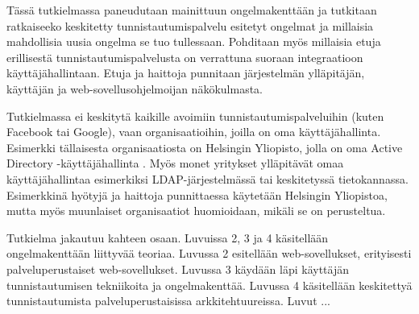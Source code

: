 Tässä tutkielmassa paneudutaan mainittuun ongelmakenttään ja tutkitaan ratkaiseeko keskitetty tunnistautumispalvelu esitetyt ongelmat ja millaisia mahdollisia uusia ongelma se tuo tullessaan. Pohditaan myös millaisia etuja erillisestä tunnistautumispalvelusta on verrattuna suoraan integraatioon käyttäjähallintaan. Etuja ja haittoja punnitaan järjestelmän ylläpitäjän, käyttäjän ja web-sovellusohjelmoijan näkökulmasta.

Tutkielmassa ei keskitytä kaikille avoimiin tunnistautumispalveluihin (kuten Facebook tai Google), vaan organisaatioihin, joilla on oma käyttäjähallinta. Esimerkki tällaisesta organisaatiosta on Helsingin Yliopisto, jolla on oma Active Directory -käyttäjähallinta \cite{tietotekniikkaa}. Myös monet yritykset ylläpitävät omaa käyttäjähallintaa esimerkiksi LDAP-järjestelmässä tai keskitetyssä tietokannassa. Esimerkkinä hyötyjä ja haittoja punnittaessa käytetään Helsingin Yliopistoa, mutta myös muunlaiset organisaatiot huomioidaan, mikäli se on perusteltua.

Tutkielma jakautuu kahteen osaan. Luvuissa 2, 3 ja 4 käsitellään ongelmakenttään liittyvää teoriaa. Luvussa 2 esitellään web-sovellukset, erityisesti palveluperustaiset web-sovellukset. Luvussa 3 käydään läpi käyttäjän tunnistautumisen tekniikoita ja ongelmakenttää. Luvussa 4 käsitellään keskitettyä tunnistautumista palveluperustaisissa arkkitehtuureissa. Luvut ...
